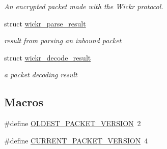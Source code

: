 \begin{DoxyCompactItemize}
\begin{DoxyCompactList}\small\item\em An encrypted packet made with the Wickr protocol. \end{DoxyCompactList}\item 
struct \hyperlink{structwickr__parse__result}{wickr\+\_\+parse\+\_\+result}
\begin{DoxyCompactList}\small\item\em result from parsing an inbound packet \end{DoxyCompactList}\item 
struct \hyperlink{structwickr__decode__result}{wickr\+\_\+decode\+\_\+result}
\begin{DoxyCompactList}\small\item\em a packet decoding result \end{DoxyCompactList}\end{DoxyCompactItemize}
\subsection*{Macros}
\begin{DoxyCompactItemize}
\item 
\#define \hyperlink{group__wickr__protocol_gad269883d0b8b26c4fa52da595ef5ddf7}{O\+L\+D\+E\+S\+T\+\_\+\+P\+A\+C\+K\+E\+T\+\_\+\+V\+E\+R\+S\+I\+ON}~2
\item 
\#define \hyperlink{group__wickr__protocol_ga89ff9f93c5494db53d3ff27353989862}{C\+U\+R\+R\+E\+N\+T\+\_\+\+P\+A\+C\+K\+E\+T\+\_\+\+V\+E\+R\+S\+I\+ON}~4
\end{DoxyCompactItemize}
